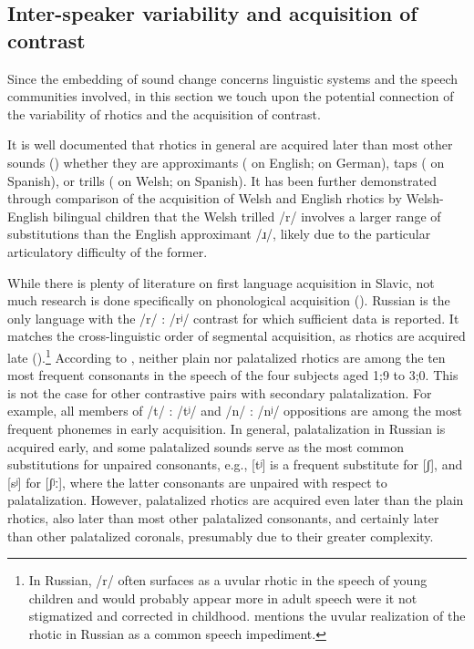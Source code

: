 \documentclass[output=paper]{langscibook}
\begin{document}
\subsection{Inter-speaker variability and acquisition of contrast}
\label{sec:kavitskaya:5.3}
Since the embedding of sound change concerns linguistic systems and the speech communities involved, in this section we touch upon the potential connection of the variability of rhotics and the acquisition of contrast. 

It is well documented that rhotics in general are acquired later than most other sounds (\citealt{McLeod2007,McLeodCrowe2018}) whether they are approximants (\citealt{DoddEtAl2013} on English; \citealt{Kehoe2017} on German), taps (\citealt{Kehoe2017} on Spanish), or trills (\citealt{BallEtAl2001} on Welsh; \citealt{Kehoe2017} on Spanish). It has been further demonstrated through comparison of the acquisition of Welsh and English rhotics by Welsh-English bilingual children \citep{BallEtAl2001} that the Welsh trilled /r/ involves a larger range of substitutions than the English approximant /ɹ/, likely due to the particular articulatory difficulty of the former.

While there is plenty of literature on first language acquisition in Slavic, not much research is done specifically on phonological acquisition (\citealt{IoninRadeva-Bork2017}). Russian is the only language with the /r/ : /rʲ/ contrast for which sufficient data is reported. It matches the cross-linguistic order of segmental acquisition, as rhotics are acquired late (\citealt{Timm1977,Zharkova2005}).\footnote{In Russian, /r/ often surfaces as a uvular rhotic in the speech of young children and would probably appear more in adult speech were it not stigmatized and corrected in childhood. \citet[89]{Avanesov1972} mentions the uvular realization of the rhotic in Russian as a common speech impediment.}  According to \citet{Zharkova2005}, neither plain nor palatalized rhotics are among the ten most frequent consonants in the speech of the four subjects aged 1;9 to 3;0. This is not the case for other contrastive pairs with secondary palatalization. For example, all members of /t/ : /tʲ/ and /n/ : /nʲ/ oppositions are among the most frequent phonemes in early acquisition. In general, palatalization in Russian is acquired early, and some palatalized sounds serve as the most common substitutions for unpaired consonants, e.g., [tʲ] is a frequent substitute for [ʃ], and [sʲ] for [ʃʲː], where the latter consonants are unpaired with respect to palatalization. However, palatalized rhotics are acquired even later than the plain rhotics, also later than most other palatalized consonants, and certainly later than other palatalized coronals, presumably due to their greater complexity.
\end{document}
